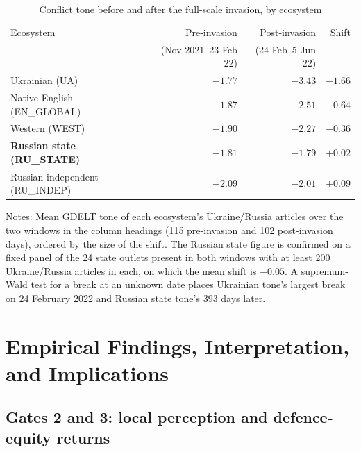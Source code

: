 \documentclass[12pt,a4paper]{article}
\newcommand{\compact}{\setlength{\tabcolsep}{3.5pt}\small}
\begin{document}
\begin{table}[H]
\centering
\caption{Conflict tone before and after the full-scale invasion, by ecosystem}
\label{tab:invasion_tone}
\begin{threeparttable}
\compact
\begin{tabular}{lrrr}
\toprule
Ecosystem & Pre-invasion & Post-invasion & Shift \\
 & (Nov 2021--23 Feb 22) & (24 Feb--5 Jun 22) & \\
\midrule
Ukrainian (UA) & $-1.77$ & $-3.43$ & $\mathbf{-1.66}$ \\
Native-English (EN\_GLOBAL) & $-1.87$ & $-2.51$ & $-0.64$ \\
Western (WEST) & $-1.90$ & $-2.27$ & $-0.36$ \\
\textbf{Russian state (RU\_STATE)} & $\mathbf{-1.81}$ & $\mathbf{-1.79}$ & $\mathbf{+0.02}$ \\
Russian independent (RU\_INDEP) & $-2.09$ & $-2.01$ & $+0.09$ \\
\bottomrule
\end{tabular}
\begin{tablenotes}
\footnotesize
\item Notes: Mean GDELT tone of each ecosystem's Ukraine/Russia articles over the two
windows in the column headings (115 pre-invasion and 102 post-invasion days),
ordered by the size of the shift. The Russian state figure is confirmed on a
fixed panel of the 24 state outlets present in both windows with at least 200
Ukraine/Russia articles in each, on which the mean shift is $-0.05$. A supremum-Wald
test for a break at an unknown date places Ukrainian tone's largest break on
24 February 2022 and Russian state tone's 393 days later.
\end{tablenotes}
\end{threeparttable}
\end{table}

\section{Empirical Findings, Interpretation, and Implications}
\label{sec:findings}

\subsection{Gates 2 and 3: local perception and defence-equity returns}
\label{sec:gate3}
\end{document}
